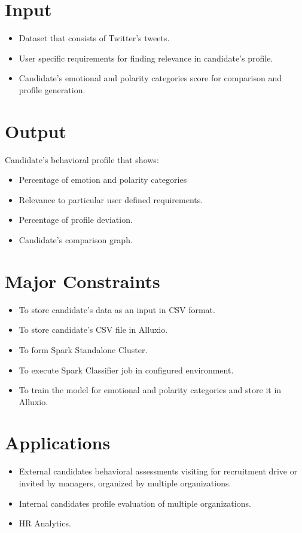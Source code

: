 \documentclass[oneside,a4paper,12pt]{pictreport}
\begin{document}
\section{Input}
\begin{itemize}
\item Dataset that consists of Twitter's tweets.
\item User specific requirements for finding relevance in candidate's profile.
\item Candidate's emotional and polarity categories score for comparison and profile generation.
\end{itemize}


\section{Output}
Candidate's behavioral profile that shows:
\begin{itemize}
\item Percentage of emotion and polarity categories
\item Relevance to particular user defined requirements.
\item Percentage of profile deviation.
\item Candidate's comparison graph.
\end{itemize}

\section{Major Constraints}

\begin{itemize}
\item To store candidate's data as an input in CSV format.
\item To store candidate's CSV file in Alluxio.
\item To form Spark Standalone Cluster. 
\item To execute Spark Classifier job in configured environment.
\item To train the model for emotional and polarity categories and store it in Alluxio.
\end{itemize}

\section{Applications}
\begin{itemize}
\item External candidates behavioral assessments visiting for recruitment drive or invited by
managers, organized by multiple organizations.
\item Internal candidates profile evaluation of multiple organizations.
\item HR Analytics.
\end{itemize}
\end{document}
